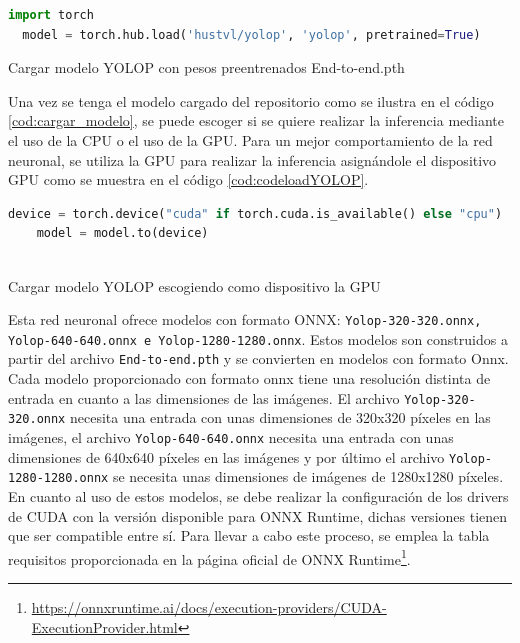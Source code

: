 \begin{code}[h]
  \begin{lstlisting}[language=Python]
  import torch
  model = torch.hub.load('hustvl/yolop', 'yolop', pretrained=True)

  \end{lstlisting}
  \caption[Cargar modelo YOLOP con pesos preentrenados End-to-end.pth]{Cargar modelo YOLOP con pesos preentrenados End-to-end.pth}
  \label{cod:cargar_modelo}
  \end{code}  

Una vez se tenga el modelo cargado del repositorio como se ilustra en el código \ref{cod:cargar_modelo}, se puede escoger 
si se quiere realizar la inferencia mediante el uso de la CPU o el uso de la GPU. Para un mejor comportamiento de la red neuronal, se utiliza
la GPU para realizar la inferencia asignándole el dispositivo GPU como se muestra en el código \ref{cod:codeloadYOLOP}.

  
\begin{code}[h]
    \begin{lstlisting}[language=Python]
    device = torch.device("cuda" if torch.cuda.is_available() else "cpu")
    model = model.to(device)
  
    \end{lstlisting}
    \caption[Cargar modelo YOLOP escogiendo como dispositivo la GPU]{Cargar modelo YOLOP escogiendo como dispositivo la GPU}
    \label{cod:codeloadYOLOP}
    \end{code}  

      Esta red neuronal ofrece modelos con formato ONNX: \texttt{Yolop-320-320.onnx, Yolop-640-640.onnx e Yolop-1280-1280.onnx}. Estos modelos son construidos a partir del archivo 
      \texttt{End-to-end.pth} y se convierten en modelos con formato Onnx. Cada modelo proporcionado con formato onnx tiene una resolución distinta de entrada en cuanto a las dimensiones
      de las imágenes. El archivo \texttt{Yolop-320-320.onnx} necesita una entrada con unas dimensiones de 320x320 píxeles en las imágenes, el archivo \texttt{Yolop-640-640.onnx} necesita 
      una entrada con unas dimensiones de 640x640 píxeles en las imágenes y por último el archivo \texttt{Yolop-1280-1280.onnx} se necesita unas dimensiones de imágenes de 1280x1280 píxeles. 
      En cuanto al uso de estos modelos, se debe realizar la configuración de los drivers de CUDA con la versión disponible para ONNX Runtime, 
      dichas versiones tienen que ser compatible entre sí. Para llevar a cabo este proceso, se emplea la tabla requisitos proporcionada en la página oficial de ONNX Runtime\footnote{\url{https://onnxruntime.ai/docs/execution-providers/CUDA-ExecutionProvider.html}}.

